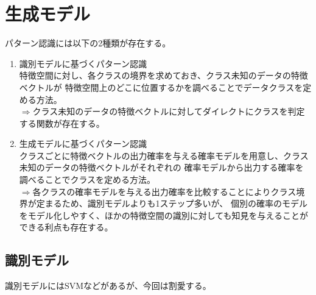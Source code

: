 \documentclass[dvipdfmx,titlepage, a4paper]{jsarticle}%
\begin{document}
\section{生成モデル}
パターン認識には以下の2種類が存在する。
\begin{enumerate}
	\item 識別モデルに基づくパターン認識\\
	特徴空間に対し、各クラスの境界を求めておき、クラス未知のデータの特徴ベクトルが
	特徴空間上のどこに位置するかを調べることでデータクラスを定める方法。\\
	$\Longrightarrow$クラス未知のデータの特徴ベクトルに対してダイレクトにクラスを判定する関数が存在する。
	\item 生成モデルに基づくパターン認識\\
	クラスごとに特徴ベクトルの出力確率を与える確率モデルを用意し、クラス未知のデータの特徴ベクトルがそれぞれの
	確率モデルから出力する確率を調べることでクラスを定める方法。\\
	$\Longrightarrow$各クラスの確率モデルを与える出力確率を比較することによりクラス境界が定まるため、識別モデルよりも1ステップ多いが、
	個別の確率のモデルをモデル化しやすく、ほかの特徴空間の識別に対しても知見を与えることができる利点も存在する。
\end{enumerate}
\subsection{識別モデル}
識別モデルにはSVMなどがあるが、今回は割愛する。
\end{document}
